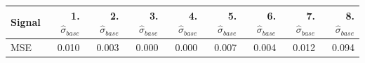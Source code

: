 \begin{tabular}{lrrrrrrrr}
\toprule
Signal & 1. $\hat\sigma_{base}$ & 2. $\hat\sigma_{base}$ & 3. $\hat\sigma_{base}$ & 4. $\hat\sigma_{base}$ & 5. $\hat\sigma_{base}$ & 6. $\hat\sigma_{base}$ & 7. $\hat\sigma_{base}$ & 8. $\hat\sigma_{base}$ \\
\midrule
MSE & 0.010 & 0.003 & 0.000 & 0.000 & 0.007 & 0.004 & 0.012 & 0.094 \\
\bottomrule
\end{tabular}
